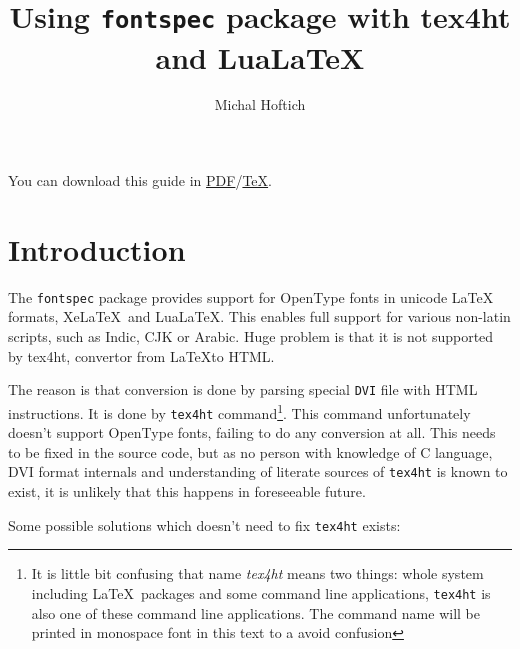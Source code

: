 \documentclass{article}
\begin{document}
\title{Using \texttt{fontspec} package with tex4ht and LuaLaTeX}
\author{Michal Hoftich}
\maketitle
\tableofcontents

You can download this guide in \href{http://michal-h21.github.io/samples/helpers4ht/fontspec.pdf}{PDF}/\href{http://michal-h21.github.io/samples/helpers4ht/fontspec.tex}{TeX}.

\section{Introduction}

The \texttt{fontspec} package provides support for OpenType fonts in unicode
LaTeX formats, Xe\LaTeX\ and Lua\LaTeX. This enables full support for various
non-latin scripts, such as Indic, CJK or Arabic. Huge problem is that it is not
supported by tex4ht, convertor from \LaTeX to HTML.

The reason is that conversion is done by parsing special \texttt{DVI} file with
HTML instructions. It is done by \texttt{tex4ht} command\footnote{It is little
  bit confusing that name \textit{tex4ht} means two things: whole system
  including \LaTeX\ packages and some command line applications,
  \texttt{tex4ht} is also one of these command line applications. The command
  name will be printed in monospace font in this text to a avoid confusion}.
This command unfortunately doesn't support OpenType fonts, failing to do any
conversion at all. This needs to be fixed in the source code, but as no person
with knowledge of C language, DVI format internals and understanding of
literate sources of \texttt{tex4ht} is known to exist, it is unlikely that this
happens in foreseeable future. 

Some possible solutions which doesn't need to fix \texttt{tex4ht} exists:
\end{document}
